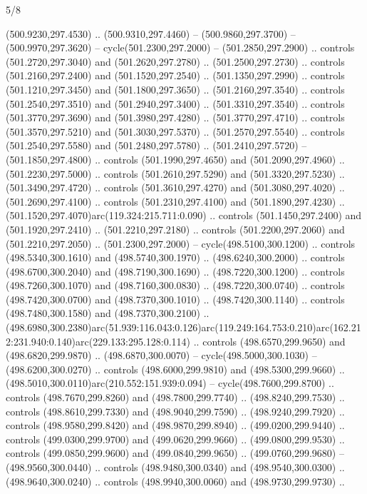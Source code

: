 \begin{flagdescription}{5/8}
\begin{scope}[xshift=0.5\flaglength,yshift=0.5\flagwidth,scale=\flagwidth/475.63]
\begin{scope}[y=0.8pt, x=0.8pt, yscale=-1, xscale=1,shift={(-450,-300)}]
\begin{scope}[cm={{1.0,0.0,0.0,1.0,(-0.0002,0.12556)}},cm={{1.0,0.0,0.0,1.0,(0.00179,0.0)}}]
\begin{scope}[cm={{1.11592,0.0,0.0,1.11592,(-106.89933,-41.77764)}}]
\begin{scope}[draw=black,fill=cfff]
\begin{scope}[fill=black]
  (500.9230,297.4530) .. (500.9310,297.4460) -- (500.9860,297.3700) --
  (500.9970,297.3620) -- cycle(501.2300,297.2000) -- (501.2850,297.2900) ..
  controls (501.2720,297.3040) and (501.2620,297.2780) .. (501.2500,297.2730) ..
  controls (501.2160,297.2400) and (501.1520,297.2540) .. (501.1350,297.2990) ..
  controls (501.1210,297.3450) and (501.1800,297.3650) .. (501.2160,297.3540) ..
  controls (501.2540,297.3510) and (501.2940,297.3400) .. (501.3310,297.3540) ..
  controls (501.3770,297.3690) and (501.3980,297.4280) .. (501.3770,297.4710) ..
  controls (501.3570,297.5210) and (501.3030,297.5370) .. (501.2570,297.5540) ..
  controls (501.2540,297.5580) and (501.2480,297.5780) .. (501.2410,297.5720) --
  (501.1850,297.4800) .. controls (501.1990,297.4650) and (501.2090,297.4960) ..
  (501.2230,297.5000) .. controls (501.2610,297.5290) and (501.3320,297.5230) ..
  (501.3490,297.4720) .. controls (501.3610,297.4270) and (501.3080,297.4020) ..
  (501.2690,297.4100) .. controls (501.2310,297.4100) and (501.1890,297.4230) ..
  (501.1520,297.4070)arc(119.324:215.711:0.090) .. controls (501.1450,297.2400)
  and (501.1920,297.2410) .. (501.2210,297.2180) .. controls (501.2200,297.2060)
  and (501.2210,297.2050) .. (501.2300,297.2000) -- cycle(498.5100,300.1200) ..
  controls (498.5340,300.1610) and (498.5740,300.1970) .. (498.6240,300.2000) ..
  controls (498.6700,300.2040) and (498.7190,300.1690) .. (498.7220,300.1200) ..
  controls (498.7260,300.1070) and (498.7160,300.0830) .. (498.7220,300.0740) ..
  controls (498.7420,300.0700) and (498.7370,300.1010) .. (498.7420,300.1140) ..
  controls (498.7480,300.1580) and (498.7370,300.2100) ..
  (498.6980,300.2380)arc(51.939:116.043:0.126)arc(119.249:164.753:0.210)arc(162.212:231.940:0.140)arc(229.133:295.128:0.114)
  .. controls (498.6570,299.9650) and (498.6820,299.9870) .. (498.6870,300.0070)
  -- cycle(498.5000,300.1030) -- (498.6200,300.0270) .. controls
  (498.6000,299.9810) and (498.5300,299.9660) ..
  (498.5010,300.0110)arc(210.552:151.939:0.094) -- cycle(498.7600,299.8700) ..
  controls (498.7670,299.8260) and (498.7800,299.7740) .. (498.8240,299.7530) ..
  controls (498.8610,299.7330) and (498.9040,299.7590) .. (498.9240,299.7920) ..
  controls (498.9580,299.8420) and (498.9870,299.8940) .. (499.0200,299.9440) ..
  controls (499.0300,299.9700) and (499.0620,299.9660) .. (499.0800,299.9530) ..
  controls (499.0850,299.9600) and (499.0840,299.9650) .. (499.0760,299.9680) --
  (498.9560,300.0440) .. controls (498.9480,300.0340) and (498.9540,300.0300) ..
  (498.9640,300.0240) .. controls (498.9940,300.0060) and (498.9730,299.9730) ..

\end{scope}
\end{scope}
\end{scope}
\end{scope}
\end{scope}
\end{scope}
\end{flagdescription}
